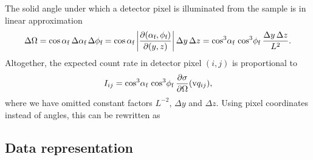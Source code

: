 The solid angle under which a detector pixel
is illuminated from the sample is in linear approximation
\begin{equation}
  \Delta\Omega
  = \cos\alpha_{\text{f}}\:\Delta\alpha_{\text{f}}\,\Delta\phi_{\text{f}}
  = \cos\alpha_{\text{f}}
    \left|\frac{\partial(\alpha_{\text{f}},\phi_{\text{f}})}{\partial(y,z)}\right|
    \Delta y \,\Delta z
  = \cos^3\!\alpha_{\text{f}}\, \cos^3\!\phi_{\text{f}}\: \frac{\Delta y \,\Delta z}{L^2}.
\end{equation}
%
%
Altogether,
the expected count rate in detector pixel $(i,j)$ is proportional to
\begin{equation}\label{EItrafo_cos}
  I_{ij} = \cos^3\!\alpha_{\text{f}}\, \cos^3\!\phi_{\text{f}}\:
          \frac{\partial\sigma}{\partial\Omega}(\text{v}{q}_{ij}),
\end{equation}
where we have omitted constant factors $L^{-2}$, $\Delta y$ and $\Delta z$.
Using pixel coordinates instead of angles, this can be rewritten as

\subsection{Data representation}

